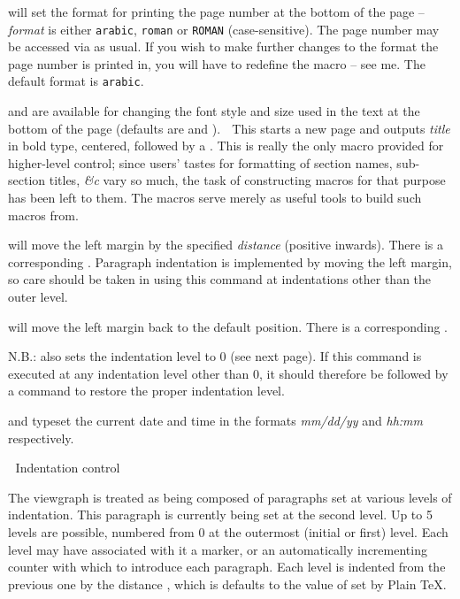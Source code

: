  will set the format for printing the page number at
the bottom of the page -- {\it format} is either {\tt arabic}, {\tt roman} or
{\tt ROMAN} (case-sensitive).  The page number may be accessed via
 as usual.  If you wish to make further changes to the format
the page number is printed in, you will have to redefine the macro
 -- see me. The default format is {\tt arabic}. 

 and  are available
for changing the font style and size used in the text at the bottom of
the page (defaults are  and ).

\filbreak {} This starts a new page and outputs {\it title} in
bold type, centered, followed by a .  This is really the only
macro provided for higher-level control; since users' tastes for formatting of
section names, sub-section titles, {\it \&c} vary so much, the task of
constructing macros for that purpose has been left to them.  The {\texview}
macros serve merely as useful tools to build such macros from. 

\filbreak {} will move the left margin by the
specified {\it distance} (positive inwards).  There is a corresponding
.  Paragraph indentation is implemented by moving the
left margin, so care should be taken in using this command at indentations
other than the outer level. 

\filbreak {} will move the left margin back to the default
position.  There is a corresponding . 

\incindent

N.B.:   also sets the indentation level to 0 (see next
page).  If this command is executed at any indentation level other than 0, it
should therefore be followed by a  command to restore the
proper indentation level. 

\decindent

 and  typeset the current date and time in
the formats {\it mm/dd/yy} and {\it hh:mm} respectively. 

\decindent

\filbreak Indentation control

\incindent

The viewgraph is treated as being composed of paragraphs set at various levels
of indentation.  This paragraph is currently being set at the second level.  Up
to 5 levels are possible, numbered from 0 at the outermost (initial or first)
level.  Each level may have associated with it a marker, or an automatically
incrementing counter with which to introduce each paragraph.  Each level is
indented from the previous one by the distance , which is
defaults to the value of  set by Plain \TeX.
\filbreak 

